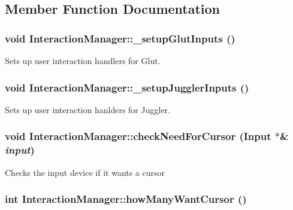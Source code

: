 \subsection{Member Function Documentation}
\hypertarget{class_interaction_manager_ab20cc9048a4e327c482d5fad992670f6}{
\subsubsection[{\_\-setupGlutInputs}]{\setlength{\rightskip}{0pt plus 5cm}void InteractionManager::\_\-setupGlutInputs ()}}
\label{class_interaction_manager_ab20cc9048a4e327c482d5fad992670f6}
Sets up user interaction handlers for Glut. \hypertarget{class_interaction_manager_ab3fae56ad6a2c3a09e5113271e7c7939}{
\subsubsection[{\_\-setupJugglerInputs}]{\setlength{\rightskip}{0pt plus 5cm}void InteractionManager::\_\-setupJugglerInputs ()}}
\label{class_interaction_manager_ab3fae56ad6a2c3a09e5113271e7c7939}
Sets up user interaction hanlders for Juggler. \hypertarget{class_interaction_manager_a6cfbd6e78234b8bfd34fc88bd333fb3b}{
\subsubsection[{checkNeedForCursor}]{\setlength{\rightskip}{0pt plus 5cm}void InteractionManager::checkNeedForCursor ({\bf Input} $\ast$\& {\em input})}}
\label{class_interaction_manager_a6cfbd6e78234b8bfd34fc88bd333fb3b}
Checks the input device if it wants a cursor \hypertarget{class_interaction_manager_a3ce3de15f8503235dbd7ee3b911e2c96}{
\subsubsection[{howManyWantCursor}]{\setlength{\rightskip}{0pt plus 5cm}int InteractionManager::howManyWantCursor ()}}

